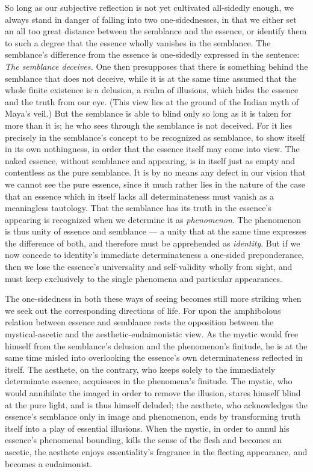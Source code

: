 \documentclass[12pt]{book}
\begin{document}
So long as our subjective reflection is not yet cultivated all-sidedly
enough, we always stand in danger of falling into two one-sidednesses, in
that we either set an all too great distance between the semblance and the
essence, or identify them to such a degree that the essence wholly vanishes
in the semblance. The semblance's difference from the essence is one-sidedly
expressed in the sentence: \emph{The semblance deceives.} One then
presupposes that there is something behind the semblance that does not
deceive, while it is at the same time assumed that the whole finite
existence is a delusion, a realm of illusions, which hides the essence and
the truth from our eye. (This view lies at the ground of the Indian myth of
Maya's veil.) But the semblance is able to blind only so long as it is taken
for more than it is; he who sees through the semblance is not deceived. For
it lies precisely in the semblance's concept to be recognized as semblance,
to show itself in its own nothingness, in order that the essence itself may
come into view. The naked essence, without semblance and appearing, is in
itself just as empty and contentless as the pure semblance. It is by no
means any defect in our vision that we cannot see the pure essence, since it
much rather lies in the nature of the case that an essence which in itself
lacks all determinateness must vanish as a meaningless tautology. That the
semblance has its truth in the essence's appearing is recognized when we
determine it as \emph{phenomenon}. The phenomenon is thus unity of essence
and semblance --- a unity that at the same time expresses the difference of
both, and therefore must be apprehended as \emph{identity}. But if we now
concede to identity's immediate determinateness a one-sided preponderance,
then we lose the essence's universality and self-validity wholly from
sight, and must keep exclusively to the single phenomena and particular
appearances.

The one-sidedness in both these ways of seeing becomes still more striking
when we seek out the corresponding directions of life. For upon the
amphibolous relation between essence and semblance rests the opposition
between the mystical-ascetic and the aesthetic-eudaimonistic view. As the
mystic would free himself from the semblance's delusion and the phenomenon's
finitude, he is at the same time misled into overlooking the essence's own
determinateness reflected in itself. The aesthete, on the contrary, who
keeps solely to the immediately determinate essence, acquiesces in the
phenomena's finitude. The mystic, who would annihilate the imaged in order
to remove the illusion, stares himself blind at the pure light, and is thus
himself deluded; the aesthete, who acknowledges the essence's semblance only
in image and phenomenon, ends by transforming truth itself into a play of
essential illusions. When the mystic, in order to annul his essence's
phenomenal bounding, kills the sense of the flesh and becomes an ascetic,
the aesthete enjoys essentiality's fragrance in the fleeting appearance, and
becomes a eudaimonist.
\end{document}
